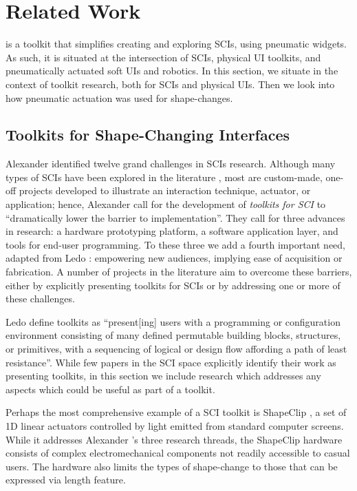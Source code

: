  \section{Related Work}
    \mp is a toolkit that simplifies creating and exploring SCIs, using
    pneumatic widgets. As such, it is situated at the intersection of
    SCIs, physical UI toolkits, and pneumatically actuated soft UIs and
    robotics. In this section, we situate \mp in the context of toolkit
    research, both for SCIs and physical UIs. Then we look into how
    pneumatic actuation was used for shape-changes.
    
    \subsection{Toolkits for Shape-Changing Interfaces}
      Alexander \etal \cite{10.1145/3173574.3173873} identified twelve grand
      challenges in SCIs research. Although many types of SCIs have been
      explored in the literature \cite{Sturdee:2018ce}, most are custom-made,
      one-off projects developed to illustrate an interaction technique,
      actuator, or application; hence, Alexander \etal
      \cite{10.1145/3173574.3173873} call for the development of
      \textit{toolkits for SCI} to ``dramatically lower the barrier to
      implementation''. They call for three advances in research: a hardware
      prototyping platform, a software application layer, and tools for end-user
      programming. To these three we add a fourth important need, adapted from
      Ledo \etal \cite{10.1145/3173574.3173610}: empowering new audiences,
      implying ease of acquisition or fabrication. A number of projects in the
      literature aim to overcome these barriers, either by explicitly presenting
      toolkits for SCIs or by addressing one or more of these challenges.
      
      Ledo \etal \cite{10.1145/3173574.3173610} define toolkits as
      ``present[ing] users with a programming or configuration environment
      consisting of many defined permutable building blocks, structures, or
      primitives, with a sequencing of logical or design flow affording a path
      of least resistance''. While few papers in the SCI space explicitly
      identify their work as presenting toolkits, in this section we include
      research which addresses any aspects which could be useful as part of a
      toolkit.
      
      Perhaps the most comprehensive example of a SCI toolkit is ShapeClip
      \cite{Hardy:2015dx}, a set of 1D linear actuators controlled by light
      emitted from standard computer screens. While it addresses Alexander
      \etal's three research threads, the ShapeClip hardware consists of complex
      electromechanical components not readily accessible to casual users. The
      hardware also limits the types of shape-change to those that can be
      expressed via length feature.
      
